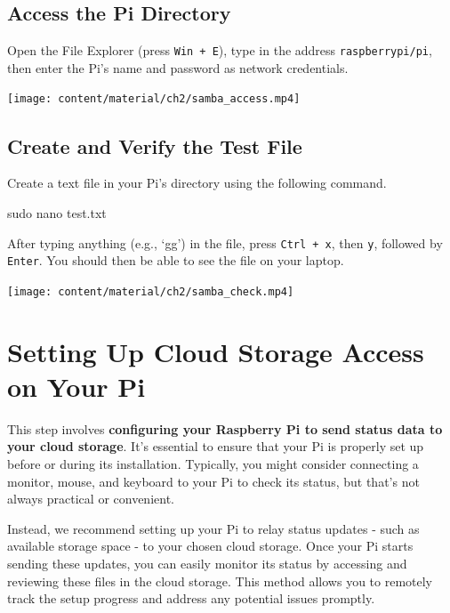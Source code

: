 \documentclass[
  letterpaper,
]{scrbook}
\newenvironment{Shaded}{\begin{snugshade}}{\end{snugshade}}
\newcommand{\FunctionTok}[1]{\textcolor[rgb]{0.28,0.35,0.67}{#1}}
\newcommand{\NormalTok}[1]{\textcolor[rgb]{0.00,0.23,0.31}{#1}}
\begin{document}
\subsection{Access the Pi Directory}\label{access-the-pi-directory}

Open the File Explorer (press \texttt{Win\ +\ E}), type in the address
\texttt{raspberrypi/pi}, then enter the Pi's name and password as
network credentials.

\texttt{[image: content/material/ch2/samba\_access.mp4]}

\subsection{Create and Verify the Test
File}\label{create-and-verify-the-test-file}

Create a text file in your Pi's directory using the following command.

\begin{Shaded}
\begin{Highlighting}[]
\FunctionTok{sudo}\NormalTok{ nano test.txt}
\end{Highlighting}
\end{Shaded}

After typing anything (e.g., `gg') in the file, press
\texttt{Ctrl\ +\ x}, then \texttt{y}, followed by \texttt{Enter}. You
should then be able to see the file on your laptop.

\texttt{[image: content/material/ch2/samba\_check.mp4]}

\section{Setting Up Cloud Storage Access on Your
Pi}\label{setting-up-cloud-storage-access-on-your-pi}

This step involves \textbf{configuring your Raspberry Pi to send status
data to your cloud storage}. It's essential to ensure that your Pi is
properly set up before or during its installation. Typically, you might
consider connecting a monitor, mouse, and keyboard to your Pi to check
its status, but that's not always practical or convenient.

Instead, we recommend setting up your Pi to relay status updates - such
as available storage space - to your chosen cloud storage. Once your Pi
starts sending these updates, you can easily monitor its status by
accessing and reviewing these files in the cloud storage. This method
allows you to remotely track the setup progress and address any
potential issues promptly.
\end{document}
